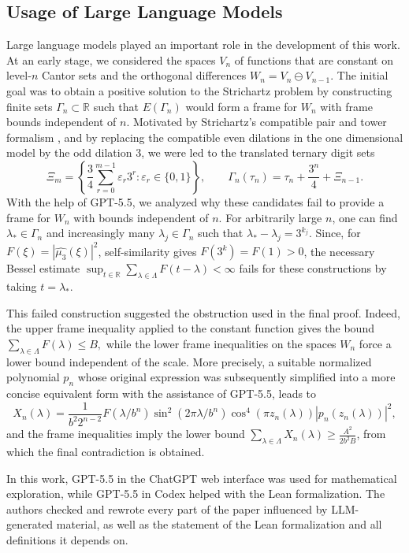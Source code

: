 \documentclass[reqno,a4paper,12pt]{amsart}
\def\R{{\mathbb R}}
\begin{document}
\subsection{Usage of Large Language Models}

Large language models played an important role in the development of this work. At an early stage, we considered the spaces $V_n$ of functions that are constant on level-$n$ Cantor sets and the orthogonal differences $W_n=V_n\ominus V_{n-1}$. The initial goal was to obtain a positive solution to the Strichartz problem by constructing finite sets $\Gamma_n\subset\R$ such that $E(\Gamma_n)$ would form a frame for $W_n$ with frame bounds independent of $n$. Motivated by Strichartz's compatible pair and tower formalism \cite{Strichartz00}, and by replacing the compatible even dilations in the one dimensional model by the odd dilation $3$, we were led to the translated ternary digit sets
$$
        \Xi_m=
        \left\{
        \frac34\sum_{r=0}^{m-1}\varepsilon_r3^r:
        \varepsilon_r\in\{0,1\}
        \right\},
        \qquad
        \Gamma_n(\tau_n)=\tau_n+\frac{3^n}{4}+\Xi_{n-1}.
$$
With the help of GPT-5.5, we analyzed why these candidates fail to provide a frame for $W_n$ with bounds independent of $n$. For arbitrarily large $n$, one can find $\lambda_*\in\Gamma_n$ and increasingly many $\lambda_j\in\Gamma_n$ such that $\lambda_*-\lambda_j=3^{k_j}$. Since, for $F(\xi)=|\widehat{\mu_3}(\xi)|^2$, self-similarity gives $F(3^k)=F(1)>0$, the necessary Bessel estimate
$
        \sup_{t\in\R}\sum_{\lambda\in\Lambda}F(t-\lambda)<\infty
$
fails for these constructions by taking $t=\lambda_*$.

This failed construction suggested the obstruction used in the final proof. Indeed, the upper frame inequality applied to the constant function gives the bound
$
        \sum_{\lambda\in\Lambda}F(\lambda)\le B,
$
while the lower frame inequalities on the spaces $W_n$ force a lower bound independent of the scale. More precisely, a suitable normalized polynomial $p_n$ whose original expression was subsequently simplified into a more concise equivalent form with the assistance of GPT-5.5, leads to
$$
        X_n(\lambda)
        =
        \frac1{b^2 2^{n-2}}
        F(\lambda/b^n)\sin^2(2\pi\lambda/b^n)
        \cos^4(\pi z_n(\lambda))
        |p_n(z_n(\lambda))|^2,
$$
and the frame inequalities imply the lower bound $\sum_{\lambda\in\Lambda}X_n(\lambda)\ge \frac{A^2}{2b^2B}$, from which the final contradiction is obtained.

In this work, GPT-5.5 in the ChatGPT web interface was used for mathematical exploration, while GPT-5.5 in Codex helped with the Lean formalization. The authors checked and rewrote every part of the paper influenced by LLM-generated material, as well as the statement of the Lean formalization and all definitions it depends on.
\end{document}
